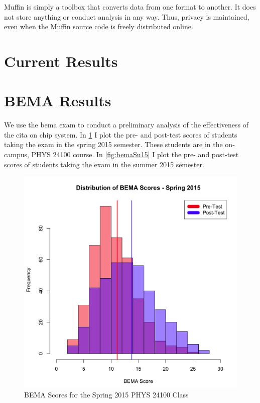 Muffin is simply a toolbox that converts data from one format to another. It does not store anything or conduct analysis in any way. Thus, privacy is maintained, even when the Muffin source code is freely distributed online.

\section{Current Results}

\section{BEMA Results}

We use the \gls{bema} exam to conduct a preliminary analysis of the effectiveness of the \gls{cita} on \gls{chip} system. In \ref{fig:bemaSp15} I plot the pre- and post-test scores of students taking the exam in the spring 2015 semester. These students are in the on-campus, PHYS 24100 course. In \ref{fig:bemaSu15} I plot the pre- and post-test scores of students taking the exam in the summer 2015 semester.

\begin{figure}[!htb]
	\centering
	\includegraphics[width=6in]{img/chapter4/bema_spring_2015}
	\caption[BEMA Scores for the Spring 2015 PHYS 24100 Class]{BEMA Scores for the Spring 2015 PHYS 24100 Class}
  \label{fig:bemaSp15}
\end{figure}


